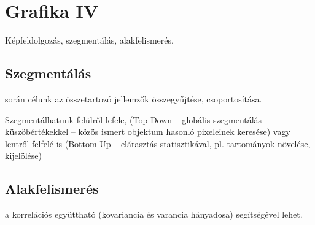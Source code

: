 \documentclass[../../main.tex]{subfiles}
\begin{document}
\section{Grafika IV}

\begin{fulltheorem}
  Képfeldolgozás, szegmentálás, alakfelismerés.
\end{fulltheorem}

\subsection{Szegmentálás}

 során célunk az összetartozó jellemzők összegyűjtése,
csoportosítása.

Szegmentálhatunk felülről lefele, (Top Down -- globális szegmentálás
küszöbértékekkel -- közös ismert objektum hasonló pixeleinek keresése)
vagy lentről felfelé is (Bottom Up -- elárasztás
statisztikával, pl. tartományok növelése, kijelölése)

\subsection{Alakfelismerés}

 a korrelációs együttható (kovariancia és varancia hányadosa)
segítségével lehet.
\end{document}
